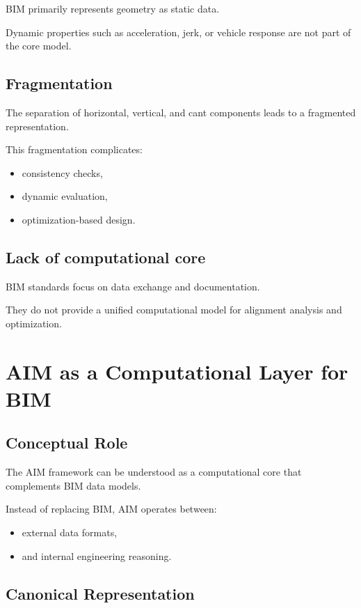 BIM primarily represents geometry as static data.

Dynamic properties such as acceleration, jerk, or vehicle response are
not part of the core model.


\subsection{Fragmentation}

The separation of horizontal, vertical, and cant components leads to a
fragmented representation.

This fragmentation complicates:
\begin{itemize}
\item consistency checks,
\item dynamic evaluation,
\item optimization-based design.
\end{itemize}


\subsection{Lack of computational core}

BIM standards focus on data exchange and documentation.

They do not provide a unified computational model for alignment
analysis and optimization.


\section{AIM as a Computational Layer for BIM}

\subsection{Conceptual Role}

The AIM framework can be understood as a computational core that
complements BIM data models.

Instead of replacing BIM, AIM operates between:
\begin{itemize}
\item external data formats,
\item and internal engineering reasoning.
\end{itemize}


\subsection{Canonical Representation}

